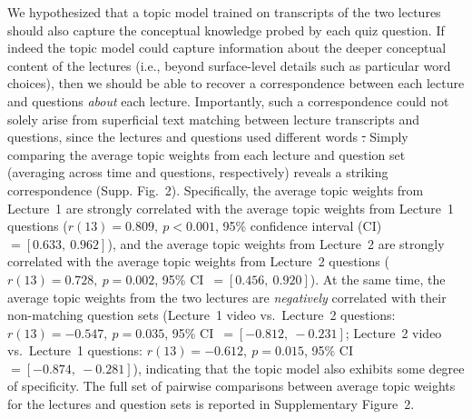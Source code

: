 \documentclass[10pt]{article}
\newcommand{\topicWeights}{2}
\newcommand{\jaccard}{5} %
\providecommand{\DIFaddtex}[1]{{\protect\color{blue}\uwave{#1}}} %
\providecommand{\DIFdeltex}[1]{{\protect\color{red}\sout{#1}}}                      %
\providecommand{\DIFaddbegin}{} %
\providecommand{\DIFaddend}{} %
\providecommand{\DIFdelbegin}{} %
\providecommand{\DIFdelend}{} %
\providecommand{\DIFadd}[1]{\texorpdfstring{\DIFaddtex{#1}}{#1}} %
\providecommand{\DIFdel}[1]{\texorpdfstring{\DIFdeltex{#1}}{}} %
\newcommand{\DIFscaledelfig}{0.5}
\newlength{\DIFdelgraphicswidth} %
\newlength{\DIFdelgraphicsheight} %
\newcommand{\DIFaddincludegraphics}[2][]{{\color{blue}\fbox{\DIFOincludegraphics[#1]{#2}}}} %
\newcommand{\DIFdelincludegraphics}[2][]{%
\sbox{\DIFdelgraphicsbox}{\DIFOincludegraphics[#1]{#2}}%
\settoboxwidth{\DIFdelgraphicswidth}{\DIFdelgraphicsbox} %
\settoboxtotalheight{\DIFdelgraphicsheight}{\DIFdelgraphicsbox} %
\scalebox{\DIFscaledelfig}{%
\parbox[b]{\DIFdelgraphicswidth}{\usebox{\DIFdelgraphicsbox}\\[-\baselineskip] \rule{\DIFdelgraphicswidth}{0em}}\llap{\resizebox{\DIFdelgraphicswidth}{\DIFdelgraphicsheight}{%
\setlength{\unitlength}{\DIFdelgraphicswidth}%
\begin{picture}(1,1)%
\thicklines\linethickness{2pt} %
{\color[rgb]{1,0,0}\put(0,0){\framebox(1,1){}}}%
{\color[rgb]{1,0,0}\put(0,0){\line( 1,1){1}}}%
{\color[rgb]{1,0,0}\put(0,1){\line(1,-1){1}}}%
\end{picture}%
}\hspace*{3pt}}} %
} %
\DeclareRobustCommand{\DIFaddbegin}{\DIFOaddbegin \let\includegraphics\DIFaddincludegraphics} %
\DeclareRobustCommand{\DIFaddend}{\DIFOaddend \let\includegraphics\DIFOincludegraphics} %
\DeclareRobustCommand{\DIFdelbegin}{\DIFOdelbegin \let\includegraphics\DIFdelincludegraphics} %
\DeclareRobustCommand{\DIFdelend}{\DIFOaddend \let\includegraphics\DIFOincludegraphics} %
\begin{document}
We hypothesized that a topic model trained on transcripts of the two lectures
should also capture the conceptual knowledge probed by each quiz question. If
indeed the topic model could capture information about the deeper conceptual
content of the lectures (i.e., beyond surface-level details such as particular
word choices), then we should be able to recover a correspondence between each
lecture and questions \textit{about} each lecture. Importantly, such a
correspondence could not solely arise from superficial text matching between
lecture transcripts and questions, since the lectures and questions \DIFaddbegin \DIFadd{often }\DIFaddend used
different words \DIFdelbegin \DIFdel{. }\DIFdelend \DIFaddbegin \DIFadd{(Supp.~Fig.~\jaccard) and phrasings. }\DIFaddend Simply comparing the
average topic weights from each lecture and question set (averaging across time
and questions, respectively) reveals a striking correspondence (Supp.
Fig.~\topicWeights). Specifically, the average topic weights from Lecture~1 are
strongly correlated with the average topic weights from Lecture~1 questions
($r(13) = 0.809,~p < 0.001$, 95\% confidence interval (CI)~$= [0.633,~0.962]$),
and the average topic weights from Lecture~2 are strongly correlated with the
average topic weights from Lecture~2 questions ($r(13) = 0.728,~p = 0.002$,
95\% CI~$= [0.456,~0.920]$). At the same time, the average topic weights from
the two lectures are \textit{negatively} correlated with their non-matching
question sets (Lecture~1 video vs.~Lecture~2 questions: $r(13) = -0.547,~p =
0.035$, 95\% CI~$= [-0.812, ~-0.231]$; Lecture~2 video vs.~Lecture~1 questions:
$r(13) = -0.612,~p = 0.015$, 95\% CI~$= [-0.874,~-0.281]$), indicating that the
topic model also exhibits some degree of specificity. The full set of pairwise
comparisons between average topic weights for the lectures and question sets is
reported in Supplementary Figure~\topicWeights.
\end{document}
